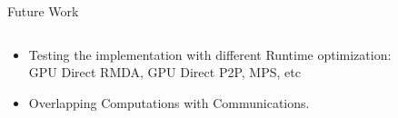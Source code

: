 \documentclass[
  english,            %
  aspectratio=169,    %
  11pt
]{tumbeamer}
\begin{document}
\begin{frame}{Future Work}
			\vfill
	\begin{columns}
		\begin{column}{.8\textwidth}
			\begin{itemize}
				\item Testing the implementation with different Runtime optimization: \\
				GPU Direct RMDA, GPU Direct P2P, MPS, etc
				\newline
				\item Overlapping Computations with Communications.
			\end{itemize}
		\end{column}
	\end{columns}
	\vfill	
   
\end{frame}



\end{document}
